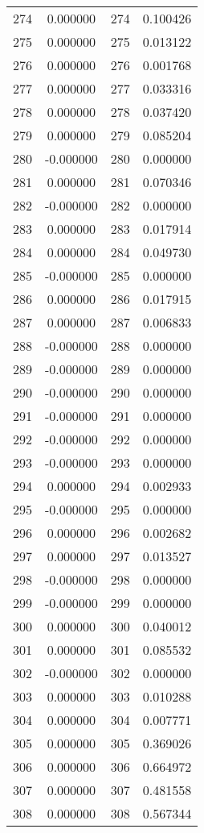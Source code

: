 \documentclass[12pt]{article}
\begin{document}
\begin{longtable}{@{}cccc@{}}
274 & 0.000000 & 274 & 0.100426 \\
275 & 0.000000 & 275 & 0.013122 \\
276 & 0.000000 & 276 & 0.001768 \\
277 & 0.000000 & 277 & 0.033316 \\
278 & 0.000000 & 278 & 0.037420 \\
279 & 0.000000 & 279 & 0.085204 \\
280 & -0.000000 & 280 & 0.000000 \\
281 & 0.000000 & 281 & 0.070346 \\
282 & -0.000000 & 282 & 0.000000 \\
283 & 0.000000 & 283 & 0.017914 \\
284 & 0.000000 & 284 & 0.049730 \\
285 & -0.000000 & 285 & 0.000000 \\
286 & 0.000000 & 286 & 0.017915 \\
287 & 0.000000 & 287 & 0.006833 \\
288 & -0.000000 & 288 & 0.000000 \\
289 & -0.000000 & 289 & 0.000000 \\
290 & -0.000000 & 290 & 0.000000 \\
291 & -0.000000 & 291 & 0.000000 \\
292 & -0.000000 & 292 & 0.000000 \\
293 & -0.000000 & 293 & 0.000000 \\
294 & 0.000000 & 294 & 0.002933 \\
295 & -0.000000 & 295 & 0.000000 \\
296 & 0.000000 & 296 & 0.002682 \\
297 & 0.000000 & 297 & 0.013527 \\
298 & -0.000000 & 298 & 0.000000 \\
299 & -0.000000 & 299 & 0.000000 \\
300 & 0.000000 & 300 & 0.040012 \\
301 & 0.000000 & 301 & 0.085532 \\
302 & -0.000000 & 302 & 0.000000 \\
303 & 0.000000 & 303 & 0.010288 \\
304 & 0.000000 & 304 & 0.007771 \\
305 & 0.000000 & 305 & 0.369026 \\
306 & 0.000000 & 306 & 0.664972 \\
307 & 0.000000 & 307 & 0.481558 \\
308 & 0.000000 & 308 & 0.567344 \\

\end{longtable}
\end{document}
